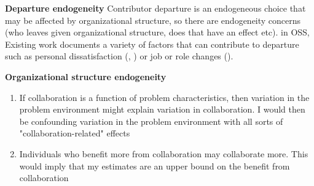 \documentclass[12pt,notitlepage]{article}
\begin{document}
\textbf{Departure endogeneity}
Contributor departure is an endogeneous choice that may be affected by organizational structure, so there are endogeneity concerns (who leaves given organizational structure, does that have an effect etc). in OSS, Existing work documents a variety of factors that can contribute to departure such as personal dissatisfaction (\cite{hannon_retaining_2008}, \cite{yu_empirical_2012}) or job or role changes (\cite{miller_why_2019}). 

\textbf{Organizational structure endogeneity}
\begin{enumerate}
    \item If collaboration is a function of problem characteristics, then variation in the problem environment might explain variation in collaboration. I would then be confounding variation in the problem environment with all sorts of "collaboration-related" effects
    \item Individuals who benefit more from collaboration may collaborate more. This would imply that my estimates are an upper bound on the benefit from collaboration 
\end{enumerate}


\iffalse
Paragraph 4 (if I end up having time to write a model): 
Model of hierarchy incorporates cooperation and communication as key features of the hierarchy that affect downstream project outcomes. However, we take these for granted and irl, communication and cooperation can't be taken for granted
\begin{enumerate}
    \item Extent of communication 
    \item Degree of cooperation, overlap (clustering)
\end{enumerate}

Existing theory tells us how organizations adapt their organizational structure and strategy in response to external shocks. However, it doesn't tell us how that adaption depends on existing organizational structure. One example: communication is an integral part of how an organization solves problems, but we don't model how it occurs. Moreover, communication itself also has pros and cons - does it have a positive effect by sharing knowledge or negative effect by creating reliance and thus inhibiting learning?

- Doesn't try to separate relationship between structure and departures
- Does not consider the complementarity of organizational structure 
- Research on impact of organizational structures only provides suggestive evidence on the mechanism by which organizational structures have impacts. 
- The focus of research has been on codebase related outcomes or "project survival" as opposed to more relevant outcomes such as usage. 
\fi 
\end{document}
